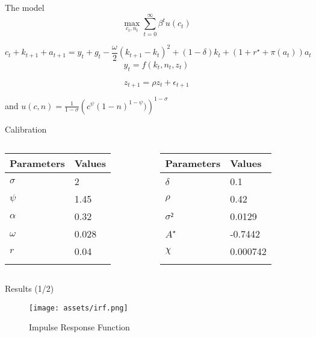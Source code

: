 \documentclass[
  ignorenonframetext,
]{beamer}
\begin{document}
\begin{frame}{The model}
\label{the-model}
\[\max_{c_t, n_t} \sum_{t=0}^{\infty} \beta^t u(c_t)\]

\[c_t + k_{t+1} + a_{t+1} = y_t + g_t - \frac{\omega}{2}(k_{t+1}-k_t)^2 +(1-\delta) k_t + (1+r^{\star}+\pi(a_t))a_t\]
\[y_t = f(k_t, n_t, z_t)\]

\[z_{t+1} = \rho z_t + \epsilon_{t+1}\]

and \(u(c, n) = \frac{1}{1-\sigma}\left(c^{\psi}(1-n)^{1-\psi}
)\right)^{1-\sigma}\)
\end{frame}

\begin{frame}{Calibration}
\label{calibration}
\begin{columns}[T]
\begin{column}{0.48\textwidth}
\begin{longtable}[]{@{}ll@{}}
\toprule\noalign{}
Parameters & Values \\
\midrule\noalign{}
\endhead
\(σ\) & 2 \\
\(ψ\) & 1.45 \\
\(α\) & 0.32 \\
\(ω\) & 0.028 \\
\(r\) & 0.04 \\
\bottomrule\noalign{}
\end{longtable}
\end{column}

\begin{column}{0.48\textwidth}
\begin{longtable}[]{@{}ll@{}}
\toprule\noalign{}
Parameters & Values \\
\midrule\noalign{}
\endhead
\(δ\) & 0.1 \\
\(ρ\) & 0.42 \\
\(σ²\) & 0.0129 \\
\(A^{\star}\) & -0.7442 \\
\(χ\) & 0.000742 \\
\bottomrule\noalign{}
\end{longtable}
\end{column}
\end{columns}
\end{frame}

\begin{frame}{Results (1/2)}
\label{results-12}
\begin{figure}[H]

{\centering \texttt{[image: assets/irf.png]}

}

\caption{Impulse Response Function}

\end{figure}%
\end{frame}
\end{document}

